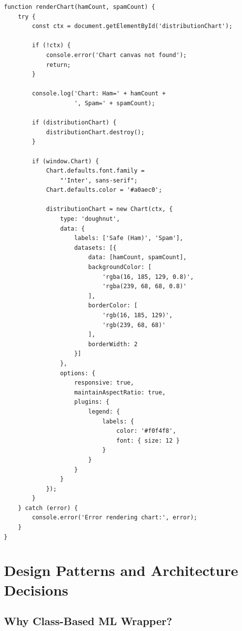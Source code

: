 \documentclass[12pt, a4paper]{article}
\begin{document}
\begin{verbatim}
function renderChart(hamCount, spamCount) {
    try {
        const ctx = document.getElementById('distributionChart');
        
        if (!ctx) {
            console.error('Chart canvas not found');
            return;
        }
        
        console.log('Chart: Ham=' + hamCount + 
                    ', Spam=' + spamCount);
        
        if (distributionChart) {
            distributionChart.destroy();
        }
        
        if (window.Chart) {
            Chart.defaults.font.family = 
                "'Inter', sans-serif";
            Chart.defaults.color = '#a0aec0';
            
            distributionChart = new Chart(ctx, {
                type: 'doughnut',
                data: {
                    labels: ['Safe (Ham)', 'Spam'],
                    datasets: [{
                        data: [hamCount, spamCount],
                        backgroundColor: [
                            'rgba(16, 185, 129, 0.8)',
                            'rgba(239, 68, 68, 0.8)'
                        ],
                        borderColor: [
                            'rgb(16, 185, 129)',
                            'rgb(239, 68, 68)'
                        ],
                        borderWidth: 2
                    }]
                },
                options: {
                    responsive: true,
                    maintainAspectRatio: true,
                    plugins: {
                        legend: {
                            labels: {
                                color: '#f0f4f8',
                                font: { size: 12 }
                            }
                        }
                    }
                }
            });
        }
    } catch (error) {
        console.error('Error rendering chart:', error);
    }
}
\end{verbatim}

\section{Design Patterns and Architecture Decisions}

\subsection{Why Class-Based ML Wrapper?}
\end{document}
